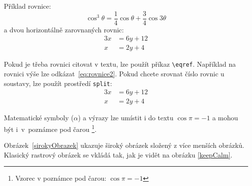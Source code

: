 
\noindent Příklad rovnice:
\begin{equation}
	\cos^3 \theta =\frac{1}{4}\cos\theta+\frac{3}{4}\cos 3\theta
	\label{eq:rovnice2}
\end{equation}
a dvou horizontálně zarovnaných rovnic: %
\begin{align} 
    \label{eq:soustava}
	3x &= 6y + 12 \\
	x &= 2y + 4 
\end{align}

Pokud je třeba rovnici citovat v textu, lze použít příkaz \verb|\eqref|. Například na rovnici výše lze odkázat~\eqref{eq:rovnice2}. Pokud chcete srovnat číslo rovnic u soustavy, lze použít prostředí \texttt{split}:
\begin{equation} \label{eq:soustavaSrovnana}
\begin{split}
	3x &= 6y + 12 \\
	x &= 2y + 4
\end{split}
\end{equation}

Matematické symboly ($\alpha$) a výrazy lze umístit i do textu $\cos\pi=-1$ a mohou být i~v~poznámce pod čarou%
\footnote{Vzorec v poznámce pod čarou: $\cos\pi=-1$}.

Obrázek~\ref{sirokyObrazek} ukazuje široký obrázek složený z více menších obrázků. Klasický rastrový obrázek se vkládá tak, jak je vidět na obrázku \ref{keepCalm}.


